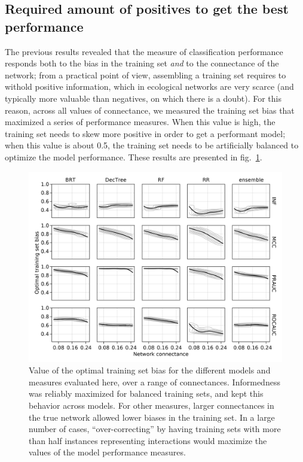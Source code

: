 \documentclass[10pt,oneside]{article}
\makeatletter
\def\maxwidth{\ifdim\Gin@nat@width>\linewidth\linewidth
\else\Gin@nat@width\fi}
\let\Oldincludegraphics\includegraphics
\renewcommand{\includegraphics}[1]{\Oldincludegraphics[width=\maxwidth]{#1}}
\makeatother
\begin{document}
\hypertarget{required-amount-of-positives-to-get-the-best-performance}{%
\subsection{Required amount of positives to get the best
performance}\label{required-amount-of-positives-to-get-the-best-performance}}

The previous results revealed that the measure of classification
performance responds both to the bias in the training set \emph{and} to
the connectance of the network; from a practical point of view,
assembling a training set requires to withold positive information,
which in ecological networks are very scarce (and typically more
valuable than negatives, on which there is a doubt). For this reason,
across all values of connectance, we measured the training set bias that
maximized a series of performance measures. When this value is high, the
training set needs to skew more positive in order to get a performant
model; when this value is about 0.5, the training set needs to be
artificially balanced to optimize the model performance. These results
are presented in fig.~\ref{fig:optimbias}.

\begin{figure}
\hypertarget{fig:optimbias}{%
\centering
\includegraphics{figures/optim_bias.png}
\caption{Value of the optimal training set bias for the different models
and measures evaluated here, over a range of connectances. Informedness
was reliably maximized for balanced training sets, and kept this
behavior across models. For other measures, larger connectances in the
true network allowed lower biases in the training set. In a large number
of cases, ``over-correcting'' by having training sets with more than
half instances representing interactions would maximize the values of
the model performance measures.}\label{fig:optimbias}
}
\end{figure}
\end{document}
